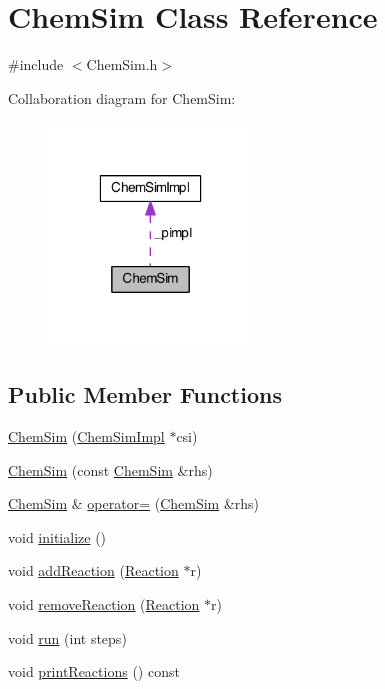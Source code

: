 \hypertarget{classChemSim}{\section{Chem\-Sim Class Reference}
\label{classChemSim}
}


{\ttfamily \#include $<$Chem\-Sim.\-h$>$}



Collaboration diagram for Chem\-Sim\-:\nopagebreak
\begin{figure}[H]
\begin{center}
\leavevmode
\includegraphics[width=154pt]{classChemSim__coll__graph}
\end{center}
\end{figure}
\subsection*{Public Member Functions}
\begin{DoxyCompactItemize}
\item 
\hyperlink{classChemSim_a01cd463070525403b1a2fa0a750c4d42}{Chem\-Sim} (\hyperlink{classChemSimImpl}{Chem\-Sim\-Impl} $\ast$csi)
\item 
\hyperlink{classChemSim_a8eb6aab0e92535e6f4ffafe14b5f68a1}{Chem\-Sim} (const \hyperlink{classChemSim}{Chem\-Sim} \&rhs)
\item 
\hyperlink{classChemSim}{Chem\-Sim} \& \hyperlink{classChemSim_a86b0266de92670b2517b9c1298acb5ac}{operator=} (\hyperlink{classChemSim}{Chem\-Sim} \&rhs)
\item 
void \hyperlink{classChemSim_affbdef9382a7c693a08f03f19e60d7fb}{initialize} ()
\item 
void \hyperlink{classChemSim_a8f4a9c679ebb599099b7c6d14418b372}{add\-Reaction} (\hyperlink{classReaction}{Reaction} $\ast$r)
\item 
void \hyperlink{classChemSim_a84652b0f19cbaa6b2ffa4a9937accfc6}{remove\-Reaction} (\hyperlink{classReaction}{Reaction} $\ast$r)
\item 
void \hyperlink{classChemSim_a954acc0bfc1adca6ba422051dd96a94d}{run} (int steps)
\item 
void \hyperlink{classChemSim_afb9c0533b2b82d39c90f7b6af2efa364}{print\-Reactions} () const 
\end{DoxyCompactItemize}
